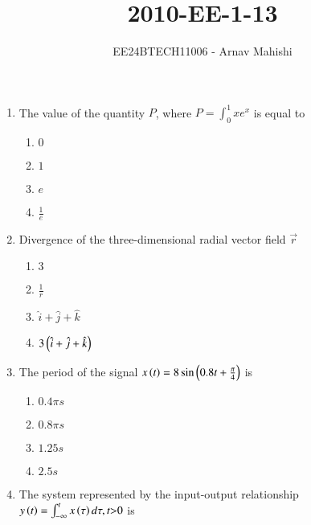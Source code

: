 \documentclass[journal]{IEEEtran}
\begin{document}

\vspace{3cm}

\title{2010-EE-1-13}
\author{EE24BTECH11006 - Arnav Mahishi}
{\let\newpage\relax\maketitle}
\begin{enumerate}
\item{
The value of the quantity $P$, where $P=\int_0^1xe^x$ is equal to
\begin{multicols}{4}
\begin{enumerate}
\item $0$
\item $1$
\item $e$ 
\item $\frac{1}{e}$
\end{enumerate}
\end{multicols}
}
\item{
Divergence of the three-dimensional radial vector field $\overrightarrow{r}$
\begin{multicols}{4}
\begin{enumerate}
\item $3$
\item $\frac{1}{r}$
\item $\hat{i}+\hat{j}+\hat{k}$
\item $3\left(\hat{i}+\hat{j}+\hat{k}\right)$
\end{enumerate}
\end{multicols}}
\item{
The period of the signal $x\left(t\right)=8\sin\left(0.8t+\frac{\pi}{4}\right)$ is
\begin{multicols}{4}
\begin{enumerate}
\item $0.4\pi s$
\item $0.8\pi s$
\item $1.25s$
\item $2.5s$
\end{enumerate}
\end{multicols}
}
\item{
The system represented by the input-output relationship $y\left(t\right)=\int_{-\infty}^t x\left(\tau\right)d\tau,t\text{\textgreater}0$ is
\begin{multicols}{2}

\end{multicols}}
\end{enumerate}
\end{document}

